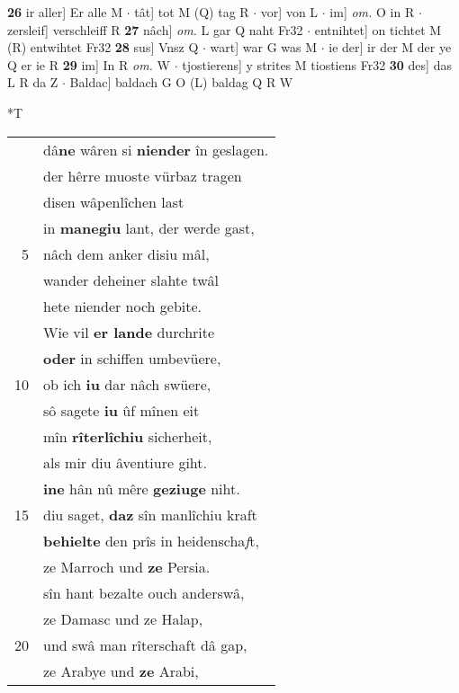 \documentclass[8pt,a4paper,notitlepage]{article}
\begin{document}
\begin{table}[ht]
\begin{minipage}[t]{0.5\linewidth}
\textbf{26} ir aller] Er alle M  $\cdot$ tât] tot M (Q) tag R  $\cdot$ vor] von L  $\cdot$ im] \textit{om.} O in R  $\cdot$ zersleif] verschleiff R \textbf{27} nâch] \textit{om.} L gar Q naht Fr32  $\cdot$ entnihtet] on tichtet M (R) entwihtet Fr32 \textbf{28} sus] Vnsz Q  $\cdot$ wart] war G was M  $\cdot$ ie der] ir der M der ye Q er ie R \textbf{29} im] In R \textit{om.} W  $\cdot$ tjostierens] y strites M tiostiens Fr32 \textbf{30} des] das L R da Z  $\cdot$ Baldac] baldach G O (L) baldag Q R W \newline
\end{minipage}
\hspace{0.5cm}
\begin{minipage}[t]{0.5\linewidth}
\small
\begin{center}*T
\end{center}
\begin{tabular}{rl}
 & dâ\textbf{ne} wâren si \textbf{niender} în geslagen.\\ 
 & der hêrre muoste vürbaz tragen\\ 
 & disen wâpenlîchen last\\ 
 & in \textbf{manegiu} lant, der werde gast,\\ 
5 & nâch dem anker disiu mâl,\\ 
 & wander deheiner slahte twâl\\ 
 & hete niender noch gebite.\\ 
 & Wie vil \textbf{er lande} durchrite\\ 
 & \textbf{oder} in schiffen umbevüere,\\ 
10 & ob ich \textbf{iu} dar nâch swüere,\\ 
 & sô sagete \textbf{iu} ûf mînen eit\\ 
 & mîn \textbf{rîterlîchiu} sicherheit,\\ 
 & als mir diu âventiure giht.\\ 
 & \textbf{i}\textbf{ne} hân nû mêre \textbf{geziuge} niht.\\ 
15 & diu saget, \textbf{daz} sîn manlîchiu kraft\\ 
 & \textbf{behielte} den prîs in heidenscha\textit{f}t,\\ 
 & ze Marroch und \textbf{ze} Persia.\\ 
 & sîn hant bezalte ouch anderswâ,\\ 
 & ze Damasc und ze Halap,\\ 
20 & und swâ man rîterschaft dâ gap,\\ 
 & ze Arabye und \textbf{ze} Arabi,\\ 

\end{tabular}
\end{minipage}
\end{table}
\end{document}
